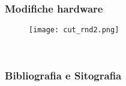 \documentclass[aspectratio=169,
]{beamer}
\begin{document}
    \begin{frame}
        \frametitle{Modifiche hardware}
        \begin{minipage}{.40\textwidth}
        \begin{figure}
            \texttt{[image: cut\_rnd2.png]}
        \end{figure}
        \end{minipage}
        \begin{minipage}{.44\textwidth}
            \begin{figure}
                \begin{minipage}{.58\textwidth}
                \end{minipage}
                \begin{minipage}{.4\textwidth}
                     \\
                \end{minipage}
            \end{figure}
        \end{minipage}
    
    \end{frame}

    \begin{frame}[allowframebreaks]
        \frametitle{Bibliografia e Sitografia}
        \printbibliography[heading=none]%
    \end{frame}
\end{document}
